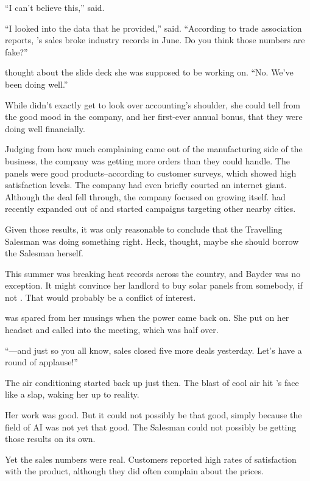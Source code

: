 ``I can't believe this,'' {\protag} said.

``I looked into the data that he provided,'' {\sidetag} said. ``According to trade association reports, {\energyCompany}'s sales broke industry records in June. Do you think those numbers are fake?''

{\protag} thought about the slide deck she was supposed to be working on. ``No. We've been doing well.''

While {\protag} didn't exactly get to look over accounting's shoulder, she could tell from the good mood in the company, and her first-ever annual bonus, that they were doing well financially.

Judging from how much complaining came out of the manufacturing side of the business, the company was getting more orders than they could handle. The panels were good products--according to customer surveys, which showed high satisfaction levels. The company had even briefly courted an internet giant. Although the deal fell through, the company focused on growing itself. {\energyCompany} had recently expanded out of \crunchyCity{} and started campaigns targeting other nearby cities.

Given those results, it was only reasonable to conclude that the Travelling Salesman was doing something right. Heck, {\protag} thought, maybe she should borrow the Salesman herself.

This summer was breaking heat records across the country, and Bayder was no exception. It might convince her landlord to buy solar panels from somebody, if not {\energyCompany}. That would probably be a conflict of interest.

{\protag} was spared from her musings when the power came back on. She put on her headset and called into the meeting, which was half over.

``---and just so you all know, sales closed five more deals yesterday. Let's have a round of applause!''

The air conditioning started back up just then. The blast of cool air hit {\protag}'s face like a slap, waking her up to reality.

Her work was good. But it could not possibly be that good, simply because the field of AI was not yet that good. The Salesman could not possibly be getting those results on its own.

Yet the sales numbers were real. Customers reported high rates of satisfaction with the product, although they did often complain about the prices.

